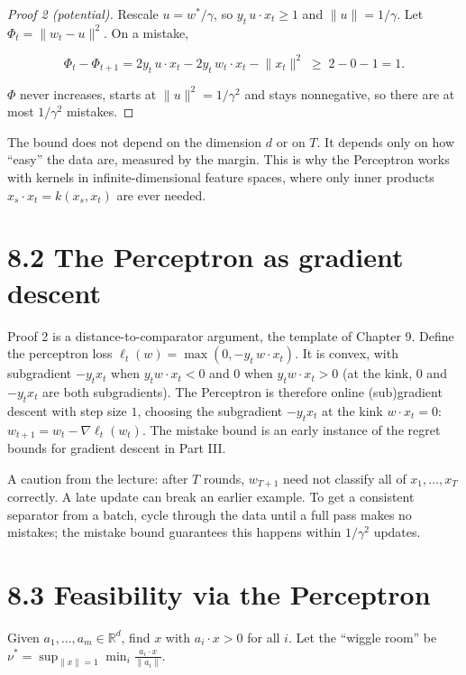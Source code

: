 \documentclass[11pt,a4paper,openany]{book}
\newcommand{\R}{\mathbb{R}}
\newcommand{\norm}[1]{\lVert #1\rVert}
\begin{document}
\begin{proof}[Proof 2 (potential)]
Rescale $u=w^*/\gamma$, so $y_t\,u\cdot x_t\ge1$ and $\norm u=1/\gamma$. Let $\Phi_t=\norm{w_t-u}^2$. On a mistake,

\[\Phi_t-\Phi_{t+1}=2y_t\,u\cdot x_t-2y_t\,w_t\cdot x_t-\norm{x_t}^2\;\ge\;2-0-1=1.\]

$\Phi$ never increases, starts at $\norm u^2=1/\gamma^2$ and stays nonnegative, so there are at most $1/\gamma^2$ mistakes.
\end{proof}

The bound does not depend on the dimension $d$ or on $T$. It depends only on how ``easy'' the data are, measured by the margin. This is why the Perceptron works with kernels in infinite-dimensional feature spaces, where only inner products $x_s\cdot x_t=k(x_s,x_t)$ are ever needed.

\section*{8.2 The Perceptron as gradient descent}\label{ch8-ogd}

Proof 2 is a distance-to-comparator argument, the template of Chapter 9. Define the perceptron loss $\ell_t(w)=\max(0,-y_t\,w\cdot x_t)$. It is convex, with subgradient $-y_tx_t$ when $y_tw\cdot x_t<0$ and $0$ when $y_tw\cdot x_t>0$ (at the kink, $0$ and $-y_tx_t$ are both subgradients). The Perceptron is therefore online (sub)gradient descent with step size $1$, choosing the subgradient $-y_tx_t$ at the kink $w\cdot x_t=0$: $w_{t+1}=w_t-\nabla\ell_t(w_t)$. The mistake bound is an early instance of the regret bounds for gradient descent in Part III.

A caution from the lecture: after $T$ rounds, $w_{T+1}$ need not classify all of $x_1,\dots,x_T$ correctly. A late update can break an earlier example. To get a consistent separator from a batch, cycle through the data until a full pass makes no mistakes; the mistake bound guarantees this happens within $1/\gamma^2$ updates.

\section*{8.3 Feasibility via the Perceptron}\label{ch8-lp}

Given $a_1,\dots,a_m\in\R^d$, find $x$ with $a_i\cdot x>0$ for all $i$. Let the ``wiggle room'' be $\nu^*=\sup_{\norm x=1}\min_i\frac{a_i\cdot x}{\norm{a_i}}$.
\end{document}
